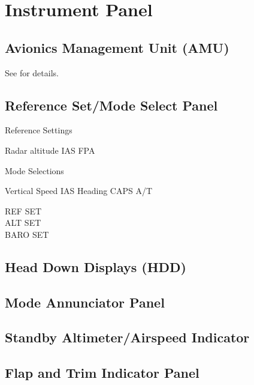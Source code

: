 \section{Instrument Panel}

\subsection{Avionics Management Unit (AMU)}
\label{sec:amu}

See  for details.

\subsection{Reference Set/Mode Select Panel}

Reference Settings
\begin{enumerate}
   Radar altitude
   \gls{IAS}
   \gls{FPA}
\end{enumerate}

Mode Selections
\begin{enumerate}
   Vertical Speed
   \gls{IAS}
   Heading
   \gls{CAPS}
   \gls{A/T}
\end{enumerate}

REF SET\\
ALT SET\\
BARO SET

\subsection{Head Down Displays (HDD)}
\label{sec:hdd}

\subsection{Mode Annunciator Panel}

\subsection{Standby Altimeter/Airspeed Indicator}

\subsection{Flap and Trim Indicator Panel}

